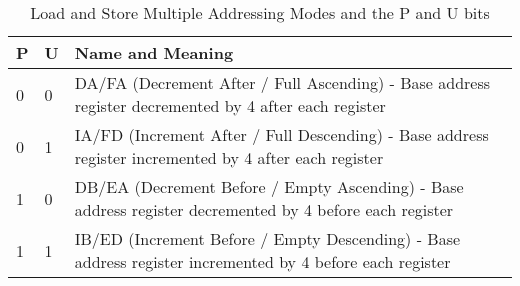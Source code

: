 \begin{table}
  \caption{Load and Store Multiple Addressing Modes and the P and U bits\citep[pp. A5-42]{armarm:2005}}
\label{table:ldm_modes}
\begin{tabularx}{\textwidth}{l|l|X}
  P & U & Name and Meaning \\ \hline
  0 & 0 & DA/FA (Decrement After / Full Ascending) - Base address register decremented by 4 after each register\\ \hline
  0 & 1 & IA/FD (Increment After / Full Descending) - Base address register incremented by 4 after each register\\ \hline
  1 & 0 & DB/EA (Decrement Before / Empty Ascending) - Base address register decremented by 4 before each register\\ \hline
  1 & 1 & IB/ED (Increment Before / Empty Descending) - Base address register incremented by 4 before each register
\end{tabularx}
\end{table}
